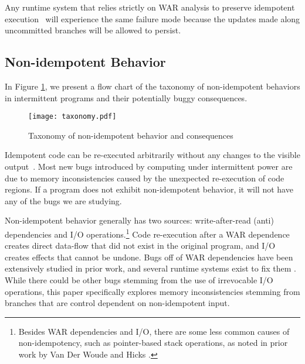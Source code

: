 Any runtime system that relies strictly on WAR analysis to preserve idempotent
execution~\cite{dino, alpaca, ratchet} will experience the same failure mode
because the updates made along uncommitted branches will be allowed to persist.


\subsection{Non-idempotent Behavior}

In Figure \ref{fig:tax}, we present a flow chart of the taxonomy of
non-idempotent behaviors in intermittent programs and their potentially buggy
consequences.

\begin{figure}[ht]
\centering
\texttt{[image: taxonomy.pdf]}
\caption{Taxonomy of non-idempotent behavior and consequences}
\label{fig:tax}
\end{figure}
Idempotent code can be re-executed arbitrarily without any changes to the
visible output~\cite{ratchet,dino}. Most new bugs introduced by computing under
intermittent power are due to memory inconsistencies caused by the unexpected
re-execution of code regions. If a program does not exhibit non-idempotent
behavior, it will not have any of the bugs we are studying.

Non-idempotent behavior generally has two sources: write-after-read (anti)
dependencies and I/O operations.\footnote{Besides WAR dependencies and I/O,
there are some less common causes of non-idempotency, such as pointer-based
stack operations, as noted in prior work by Van Der Woude and Hicks
\cite{ratchet}.} Code re-execution after a WAR dependence creates direct
data-flow that did not exist in the original program, and I/O creates effects
that cannot be undone. Bugs off of WAR dependencies have been extensively
studied in prior work, and several runtime systems exist to fix them
\cite{ratchet, alpaca, dino}. While there could be other bugs
stemming from the use of irrevocable I/O operations, this paper specifically
explores memory inconsistencies stemming from branches that are control
dependent on non-idempotent input.

